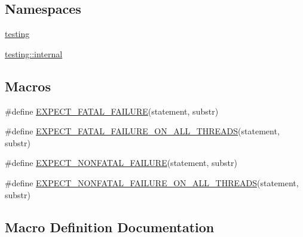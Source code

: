 \subsection*{Namespaces}
\begin{DoxyCompactItemize}
\item 
 \hyperlink{namespacetesting}{testing}
\item 
 \hyperlink{namespacetesting_1_1internal}{testing\+::internal}
\end{DoxyCompactItemize}
\subsection*{Macros}
\begin{DoxyCompactItemize}
\item 
\#define \hyperlink{gtest-spi_8h_a819a3fd7f8b8cf24b6f1b3a26708973d}{E\+X\+P\+E\+C\+T\+\_\+\+F\+A\+T\+A\+L\+\_\+\+F\+A\+I\+L\+U\+RE}(statement,  substr)
\item 
\#define \hyperlink{gtest-spi_8h_ad8aac5bc859b2ddc07583636ae4f45cf}{E\+X\+P\+E\+C\+T\+\_\+\+F\+A\+T\+A\+L\+\_\+\+F\+A\+I\+L\+U\+R\+E\+\_\+\+O\+N\+\_\+\+A\+L\+L\+\_\+\+T\+H\+R\+E\+A\+DS}(statement,  substr)
\item 
\#define \hyperlink{gtest-spi_8h_a8376fd6821bd88fd806697355e79e138}{E\+X\+P\+E\+C\+T\+\_\+\+N\+O\+N\+F\+A\+T\+A\+L\+\_\+\+F\+A\+I\+L\+U\+RE}(statement,  substr)
\item 
\#define \hyperlink{gtest-spi_8h_a9f4cf1f150fe9facfc4cbf0bae646ee9}{E\+X\+P\+E\+C\+T\+\_\+\+N\+O\+N\+F\+A\+T\+A\+L\+\_\+\+F\+A\+I\+L\+U\+R\+E\+\_\+\+O\+N\+\_\+\+A\+L\+L\+\_\+\+T\+H\+R\+E\+A\+DS}(statement,  substr)
\end{DoxyCompactItemize}


\subsection{Macro Definition Documentation}
